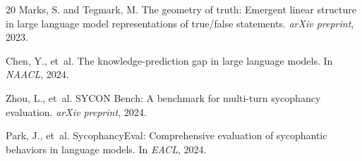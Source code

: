 \documentclass[11pt,a4paper]{article}
\begin{document}
\begin{thebibliography}{20}
Marks, S. and Tegmark, M.
\newblock The geometry of truth: Emergent linear structure in large language model representations of true/false statements.
\newblock \emph{arXiv preprint}, 2023.

Chen, Y., et~al.
\newblock The knowledge-prediction gap in large language models.
\newblock In \emph{NAACL}, 2024.

Zhou, L., et~al.
\newblock SYCON Bench: A benchmark for multi-turn sycophancy evaluation.
\newblock \emph{arXiv preprint}, 2024.

Park, J., et~al.
\newblock SycophancyEval: Comprehensive evaluation of sycophantic behaviors in language models.
\newblock In \emph{EACL}, 2024.

\end{thebibliography}
\end{document}

